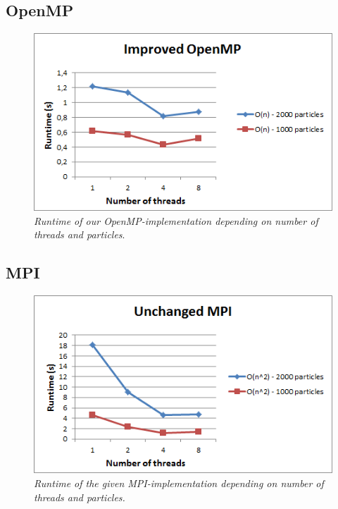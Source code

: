 \documentclass[11pt,a4paper]{article}
\begin{document}
\subsection{OpenMP}
\begin{figure}[h!]
\centering
\includegraphics[scale=0.8]{pics/open1.png}
\caption{\emph{Runtime of our OpenMP-implementation depending on number of threads and particles}.}
\label{fig:gird}
\end{figure}
\subsection{MPI}
\begin{figure}[h!]
\centering
\includegraphics[scale=0.8]{pics/mpi1.png}
\caption{\emph{Runtime of the given MPI-implementation depending on number of threads and particles.}}
\label{fig:gird}
\end{figure}
\end{document}
